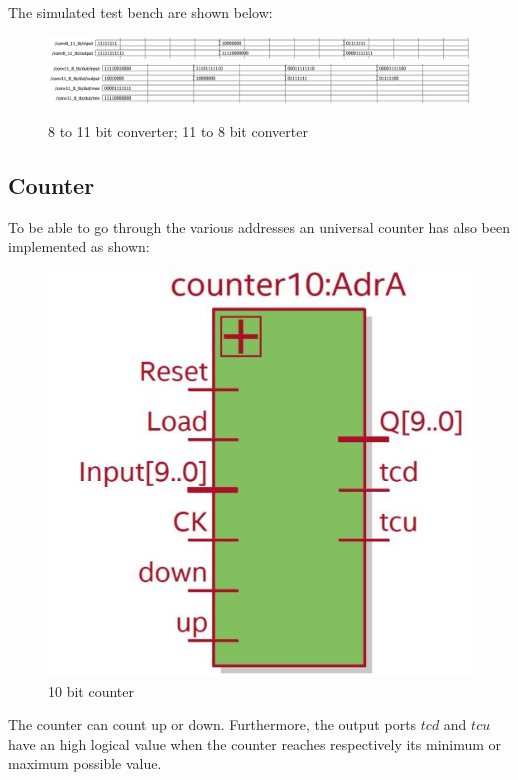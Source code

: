 \documentclass[12pt]{article}
\begin{document}
The simulated test bench are shown below: 

\begin{figure}[h!]
	\centering
	\includegraphics[scale = 0.47]{immagini/8_11_tb.png}
	\vspace{1mm}	
	\centering
	\includegraphics[scale = 0.47]{immagini/11_8_tb.png}
	\caption{8 to 11 bit converter; 11 to 8 bit converter}
\end{figure}
\newpage
\subsection*{Counter}
To be able to go through the various addresses an universal counter has also been implemented as shown: 
\begin{figure}[h!]
	\centering
	\includegraphics[scale = 0.47]{immagini/counter10.jpg}
	\caption{10 bit counter}
\end{figure}
The counter can count up or down. 
Furthermore, the output ports $tcd$ and $tcu$ have an high logical value when the counter reaches respectively its minimum or maximum possible value.
\end{document}
